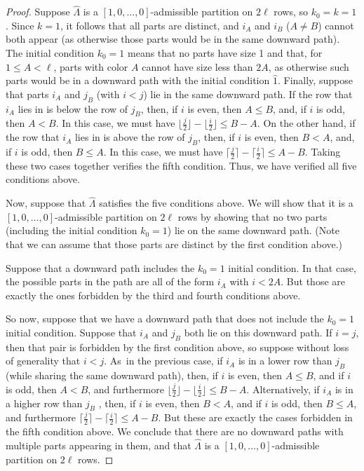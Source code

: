 \documentclass[10pt,a4paper]{amsart}
\numberwithin{equation}{section}
\theoremstyle{definition}
\newcommand{\ficone}{{\widehat{1}}}
\newcommand{\LH}{{\widehat{\Lambda}}}
\begin{document}
\begin{proof}
Suppose $\LH$ is a $[1,0,\dots,0]$-admissible partition on $2\ell$ rows, so $k_0=k=1$. Since $k=1$, it follows that all parts are distinct, and $i_A$ and $i_B$ ($A\ne B$) cannot both appear (as otherwise those parts would be in the same downward path). The initial condition $k_0=1$ means that no parts have size 1 and that, for $1\le A < \ell$, parts with color $A$ cannot have size less than $2A$, as otherwise such parts would be in a downward path with the initial condition $\ficone$.
Finally, suppose that parts $i_A$ and $j_B$ (with $i<j$) lie in the same downward path. If the row that $i_A$ lies in is below the row of $j_B$, then, if $i$ is even, then $A \le B$, and, if $i$ is odd, then $A < B$. In this case, we must have $ \bigl\lfloor\frac j2\bigr\rfloor-\bigl\lfloor\frac i2\bigl\rfloor\le B-A$. On the other hand, if the row that $i_A$ lies in is above the row of $j_B$, then, if $i$ is even, then $B<A$, and, if $i$ is odd, then $B \le A$. In this case, we must have $ \bigl\lceil\frac j2\bigr\rceil-\bigl\lceil\frac i2\bigr\rceil\le A-B$. Taking these two cases together verifies the fifth condition. Thus, we have verified all five conditions above.

Now, suppose that $\LH$ satisfies the five conditions above. We will show that it is a $[1,0,\dots,0]$-admissible partition on $2\ell$ rows by showing that no two parts (including the initial condition $k_0=1$) lie on the same downward path. (Note that we can assume that those parts are distinct by the first condition above.)

Suppose that a downward path includes the $k_0=1$ initial condition. In that case, the possible parts in the path are all of the form $i_A$ with $i< 2A$. But those are exactly the ones forbidden by the third and fourth conditions above.

So now, suppose that we have a downward path that does not include the $k_0=1$ initial condition. Suppose that $i_A$ and $j_B$ both lie on this downward path. If $i=j$, then that pair is forbidden by the first condition above, so suppose without loss of generality that $i<j$. As~in the previous case, if $i_A$ is in a lower row than $j_B$ (while sharing the same downward path), then, if $i$ is even, then $A \le B$, and if $i$ is odd, then $A<B$, and furthermore $ \bigl\lfloor\frac j2\bigr\rfloor-\bigl\lfloor\frac i2\bigr\rfloor\le B-A$. Alternatively, if $i_A$ is in a higher row than $j_B$ , then, if $i$ is even, then $B<A$, and if $i$ is odd, then $B \le A$, and furthermore
$ \bigl\lceil\frac j2\bigr\rceil-\bigl\lceil\frac i2\bigr\rceil\le A-B$. But these are exactly the cases forbidden in the fifth condition above. We conclude that there are no downward paths with multiple parts appearing in them, and that $\LH$ is a $[1,0,\dots,0]$-admissible partition on $2\ell$ rows.
\end{proof}
\end{document}
